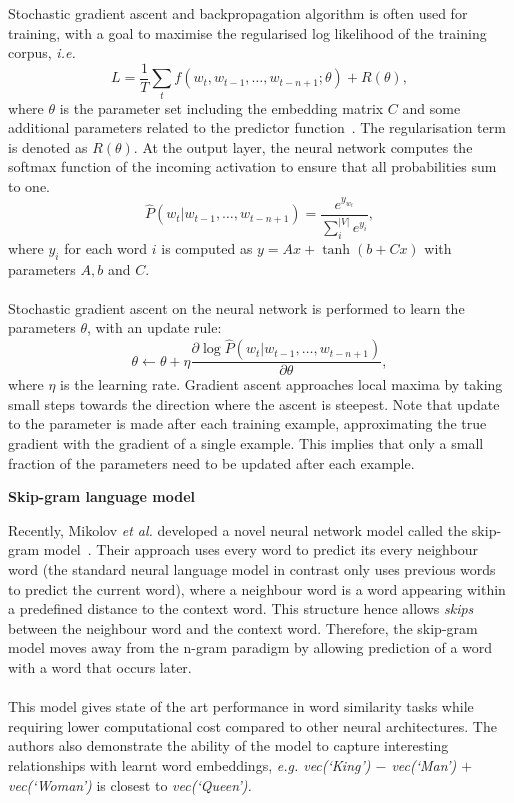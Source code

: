 \documentclass[a4paper,12pt,twoside,openright]{report}
\newcommand{\tb}{\vspace{10pt} \textbf}
\newcommand{\ti}{\textit}
\newcommand{\nl}{\\ \\}
\begin{document}
Stochastic gradient ascent and backpropagation algorithm is often used for training, with a goal to maximise the regularised log likelihood of the training corpus, \ti{i.e.}
$$L=\frac{1}{T}\sum_t^{}{f(w_t,w_{t-1},\ldots,w_{t-n+1};\theta)+R(\theta)},$$ where
\noindent $\theta$ is the parameter set including the embedding matrix $C$ and some additional parameters related to the predictor function~\cite{rumelhart88}. The regularisation term is denoted as $R(\theta).$ At the output layer, the neural network computes the softmax function of the incoming activation to ensure that all probabilities sum to one.
\begin{equation}
\hat{P}(w_t|w_{t-1},\dots,w_{t-n+1}) = \frac{e^{y_{w_t}}}{\sum_i^{|V|}{e^{y_i}}},
\label{eq:ch2:output_layer}
\end{equation}
\noindent where $y_i$ for each word $i$ is computed as $y=Ax+\tanh(b+Cx)$ with parameters $A, b$ and $C$.
\nl
Stochastic gradient ascent on the neural network is performed to learn the parameters $\theta$, with an update rule:
\begin{equation}
\theta \leftarrow \theta + \eta\frac{\partial\log\hat{P}(w_t|w_{t-1},\dots,w_{t-n+1})}{\partial\theta},
\label{eq:ch2:sgd}
\end{equation}
where $\eta$ is the learning rate. Gradient ascent approaches local maxima by taking small steps towards the direction where the ascent is steepest. Note that update to the parameter is made after each training example, approximating the true gradient with the gradient of a single example. This implies that only a small fraction of the parameters need to be updated after each example.

\tb{Skip-gram language model}

Recently, Mikolov \ti{et al.} developed a novel neural network model called the skip-gram model~\cite{mikolov13}. Their approach uses every word to predict its every neighbour word (the standard neural language model in contrast only uses previous words to predict the current word), where a neighbour word is a word appearing within a predefined distance to the context word. This structure hence allows \ti{skips} between the neighbour word and the context word. Therefore, the skip-gram model moves away from the n-gram paradigm by allowing prediction of a word with a word that occurs later. 
\nl
This model gives state of the art performance in word similarity tasks while requiring lower computational cost compared to other neural architectures. The authors also demonstrate the ability of the model to capture interesting relationships with learnt word embeddings, \ti{e.g. vec(`King') $-$ vec(`Man') $+$ vec(`Woman')} is closest to \ti{vec(`Queen').}
\end{document}
